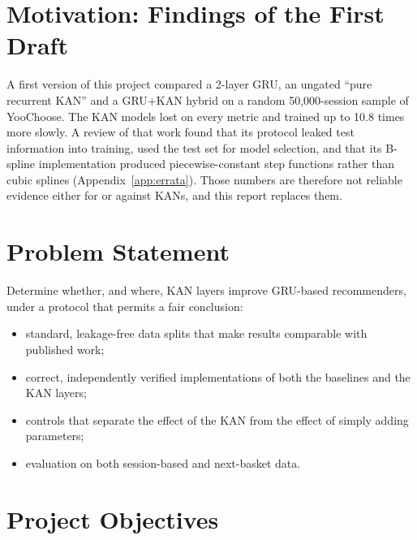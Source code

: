 \documentclass[12pt,a4paper]{report}
\begin{document}
\section{Motivation: Findings of the First Draft}

A first version of this project compared a 2-layer GRU, an ungated ``pure
recurrent KAN'' and a GRU+KAN hybrid on a random 50,000-session sample of
YooChoose. The KAN models lost on every metric and trained up to 10.8 times more
slowly. A review of that work found that its protocol leaked test information
into training, used the test set for model selection, and that its B-spline
implementation produced piecewise-constant step functions rather than cubic
splines (Appendix~\ref{app:errata}). Those numbers are therefore not reliable
evidence either for or against KANs, and this report replaces them.

\section{Problem Statement}

Determine whether, and where, KAN layers improve GRU-based recommenders, under
a protocol that permits a fair conclusion:

\begin{itemize}
    \item standard, leakage-free data splits that make results comparable with
          published work;
    \item correct, independently verified implementations of both the baselines
          and the KAN layers;
    \item controls that separate the effect of the KAN from the effect of simply
          adding parameters;
    \item evaluation on both session-based and next-basket data.
\end{itemize}

\section{Project Objectives}
\end{document}
